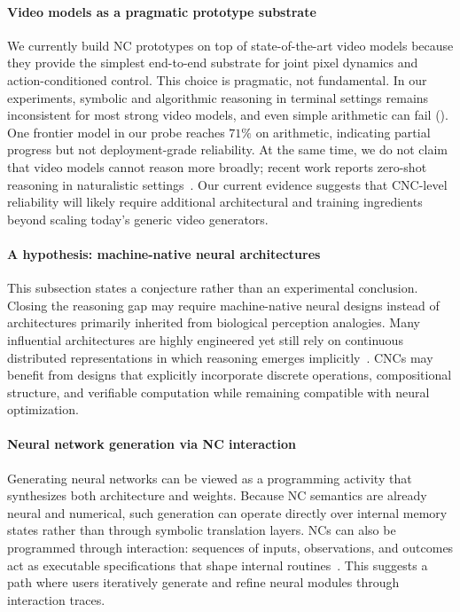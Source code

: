 \paragraph{Video models as a pragmatic prototype substrate}
We currently build NC prototypes on top of state-of-the-art video models because they provide the simplest end-to-end substrate for joint pixel dynamics and action-conditioned control.
This choice is pragmatic, not fundamental.
In our experiments, symbolic and algorithmic reasoning in terminal settings remains inconsistent for most strong video models, and even simple arithmetic can fail ().
One frontier model in our probe reaches $71\%$ on arithmetic, indicating partial progress but not deployment-grade reliability.
At the same time, we do not claim that video models cannot reason more broadly; recent work reports zero-shot reasoning in naturalistic settings~\citep{wiedemer2025video}.
Our current evidence suggests that CNC-level reliability will likely require additional architectural and training ingredients beyond scaling today's generic video generators.

\paragraph{A hypothesis: machine-native neural architectures}
This subsection states a conjecture rather than an experimental conclusion.
Closing the reasoning gap may require machine-native neural designs instead of architectures primarily inherited from biological perception analogies.
Many influential architectures are highly engineered yet still rely on continuous distributed representations in which reasoning emerges implicitly~\citep{fukushima1980neocognitron,lecun2015deep,vaswani2017attention}.
CNCs may benefit from designs that explicitly incorporate discrete operations, compositional structure, and verifiable computation while remaining compatible with neural optimization.

\paragraph{Neural network generation via NC interaction}
Generating neural networks can be viewed as a programming activity that synthesizes both architecture and weights.
Because NC semantics are already neural and numerical, such generation can operate directly over internal memory states rather than through symbolic translation layers.
NCs can also be programmed through interaction: sequences of inputs, observations, and outcomes act as executable specifications that shape internal routines~\citep{cypher1993watch}.
This suggests a path where users iteratively generate and refine neural modules through interaction traces.

